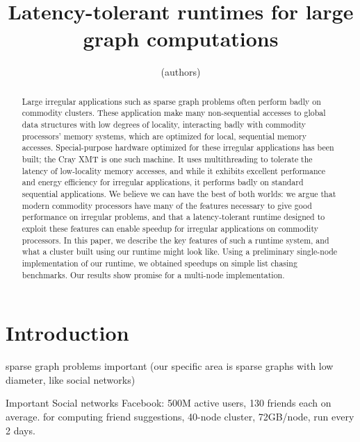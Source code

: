 \documentclass{acm_proc_article-sp}
\begin{document}
\title{Latency-tolerant runtimes for large graph computations}

\author{
(authors)
}

\maketitle
\begin{abstract}

  Large irregular applications such as sparse graph problems often
  perform badly on commodity clusters. These application make many
  non-sequential accesses to global data structures with low degrees of
  locality, interacting badly with commodity processors' memory
  systems, which are optimized for local, sequential memory
  accesses. Special-purpose hardware optimized for these irregular
  applications has been built; the Cray XMT is one such machine. It
  uses multithreading to tolerate the latency of low-locality memory
  accesses, and while it exhibits excellent performance and energy
  efficiency for irregular applications, it performs badly on standard
  sequential applications. We believe we can have the best of both
  worlds: we argue that modern commodity processors have many of the
  features necessary  to give good performance on irregular problems,
  and that a latency-tolerant runtime designed to exploit these
  features can enable speedup for irregular applications on commodity
  processors. In this paper, we describe the key features of such a
  runtime system, and what a cluster built using our runtime might
  look like. Using a preliminary single-node implementation of our
  runtime, we obtained speedups on simple list chasing benchmarks. Our results show promise for a multi-node implementation.

\end{abstract}

\section{Introduction}

sparse graph problems important (our specific area is sparse graphs with low diameter, like social networks) 

Important 
Social networks
Facebook: 500M active users, 130 friends each on average. for
computing friend suggestions, 40-node cluster, 72GB/node, run every 2
days.
\end{document}
